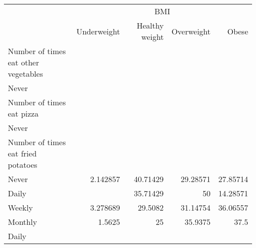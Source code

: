 \documentclass{article}
\begin{document}
\begin{tabular}{lllll}
\cline{1-5}
\multicolumn{1}{c}{} &
  \multicolumn{4}{|c}{BMI} \\
\multicolumn{1}{c}{} &
  \multicolumn{1}{|r}{Underweight} &
  \multicolumn{1}{r}{Healthy weight} &
  \multicolumn{1}{r}{Overweight} &
  \multicolumn{1}{r}{Obese} \\
\cline{1-5}
\multicolumn{1}{l}{Number of times eat other vegetables} &
  \multicolumn{1}{|r}{} &
  \multicolumn{1}{r}{} &
  \multicolumn{1}{r}{} &
  \multicolumn{1}{r}{} \\
\multicolumn{1}{l}{\hspace{1em}Never} &
  \multicolumn{1}{|r}{} &
  \multicolumn{1}{r}{} &
  \multicolumn{1}{r}{} &
  \multicolumn{1}{r}{} \\
\multicolumn{1}{l}{\hspace{2em}Number of times eat pizza} &
  \multicolumn{1}{|r}{} &
  \multicolumn{1}{r}{} &
  \multicolumn{1}{r}{} &
  \multicolumn{1}{r}{} \\
\multicolumn{1}{l}{\hspace{3em}Never} &
  \multicolumn{1}{|r}{} &
  \multicolumn{1}{r}{} &
  \multicolumn{1}{r}{} &
  \multicolumn{1}{r}{} \\
\multicolumn{1}{l}{\hspace{4em}Number of times eat fried potatoes} &
  \multicolumn{1}{|r}{} &
  \multicolumn{1}{r}{} &
  \multicolumn{1}{r}{} &
  \multicolumn{1}{r}{} \\
\multicolumn{1}{l}{\hspace{5em}Never} &
  \multicolumn{1}{|r}{2.142857} &
  \multicolumn{1}{r}{40.71429} &
  \multicolumn{1}{r}{29.28571} &
  \multicolumn{1}{r}{27.85714} \\
\multicolumn{1}{l}{\hspace{5em}Daily} &
  \multicolumn{1}{|r}{} &
  \multicolumn{1}{r}{35.71429} &
  \multicolumn{1}{r}{50} &
  \multicolumn{1}{r}{14.28571} \\
\multicolumn{1}{l}{\hspace{5em}Weekly} &
  \multicolumn{1}{|r}{3.278689} &
  \multicolumn{1}{r}{29.5082} &
  \multicolumn{1}{r}{31.14754} &
  \multicolumn{1}{r}{36.06557} \\
\multicolumn{1}{l}{\hspace{5em}Monthly} &
  \multicolumn{1}{|r}{1.5625} &
  \multicolumn{1}{r}{25} &
  \multicolumn{1}{r}{35.9375} &
  \multicolumn{1}{r}{37.5} \\
\multicolumn{1}{l}{\hspace{3em}Daily} &
  \multicolumn{1}{|r}{} &

\end{tabular}
\end{document}
